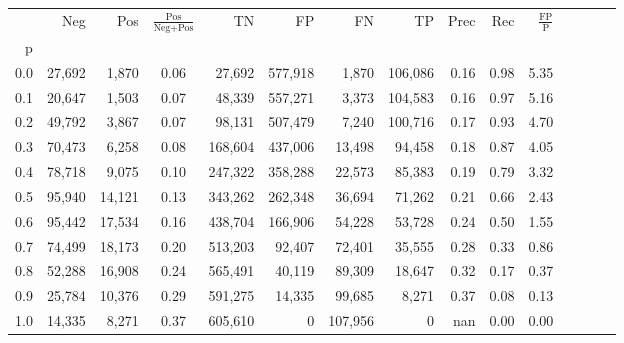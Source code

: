 \begin{tabular}{rrrcrrrrrrrrrrr}
\toprule
{} &     Neg &     Pos & $\frac{\text{Pos}}{\text{Neg}+\text{Pos}}$ &       TN &       FP &       FN &       TP &  Prec &   Rec & $\frac{\text{FP}}{\text{P}}$ \\
p   &         &         &                                            &          &          &          &          &       &       &                              \\
\midrule
0.0 &  27,692 &   1,870 &                                       0.06 &   27,692 &  577,918 &    1,870 &  106,086 &  0.16 &  0.98 &                         5.35 \\
0.1 &  20,647 &   1,503 &                                       0.07 &   48,339 &  557,271 &    3,373 &  104,583 &  0.16 &  0.97 &                         5.16 \\
0.2 &  49,792 &   3,867 &                                       0.07 &   98,131 &  507,479 &    7,240 &  100,716 &  0.17 &  0.93 &                         4.70 \\
0.3 &  70,473 &   6,258 &                                       0.08 &  168,604 &  437,006 &   13,498 &   94,458 &  0.18 &  0.87 &                         4.05 \\
0.4 &  78,718 &   9,075 &                                       0.10 &  247,322 &  358,288 &   22,573 &   85,383 &  0.19 &  0.79 &                         3.32 \\
0.5 &  95,940 &  14,121 &                                       0.13 &  343,262 &  262,348 &   36,694 &   71,262 &  0.21 &  0.66 &                         2.43 \\
0.6 &  95,442 &  17,534 &                                       0.16 &  438,704 &  166,906 &   54,228 &   53,728 &  0.24 &  0.50 &                         1.55 \\
0.7 &  74,499 &  18,173 &                                       0.20 &  513,203 &   92,407 &   72,401 &   35,555 &  0.28 &  0.33 &                         0.86 \\
0.8 &  52,288 &  16,908 &                                       0.24 &  565,491 &   40,119 &   89,309 &   18,647 &  0.32 &  0.17 &                         0.37 \\
0.9 &  25,784 &  10,376 &                                       0.29 &  591,275 &   14,335 &   99,685 &    8,271 &  0.37 &  0.08 &                         0.13 \\
1.0 &  14,335 &   8,271 &                                       0.37 &  605,610 &        0 &  107,956 &        0 &   nan &  0.00 &                         0.00 \\
\bottomrule
\end{tabular}
